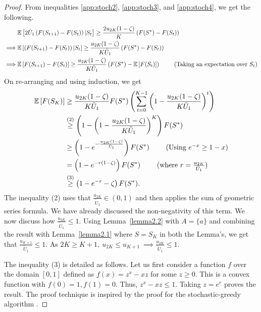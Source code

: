 \begin{proof}
From inequalities \ref{app:stoch2}, \ref{app:stoch3},  and \ref{app:stoch4}, we get the following.
\begin{align*}
& \mathbb{E}\left[2\tilde{U}_1\left(F(S_{t+1})- F(S_t)\right)|S_t\right] \geq \frac{2u_{2K}(1-\zeta)}{K} \left( F(S^*)-F(S_t)\right)\\
\implies & \mathbb{E}\left[\left(F(S_{t+1})- F(S_t)\right)|S_t\right] \geq \frac{u_{2K}(1-\zeta)}{K\tilde{U}_1} \left( F(S^*)-F(S_t)\right) \\
\implies & \mathbb{E}\left[F(S_{t+1})- F(S_t)\right] \geq \frac{u_{2K}(1-\zeta)}{K\tilde{U}_1} \left( F(S^*)-\mathbb{E}\left[F(S_t)\right]\right) \ \tag{Taking an expectation over $S_t$}
\end{align*}
On re-arranging and using induction, we get
\begin{align*}
\E\left[F(S_K)\right]&\geq \frac{u_{2K}(1-\zeta)}{K\tilde{U}_1} F(S^*)\left( \sum_{t=0}^{K-1} \left( 1-\frac{u_{2K}(1-\zeta)}{K\tilde{U}_1} \right)^t \right)\\
    &\stackrel{(2)}{\geq} \left(1-\left( 1-\frac{u_{2K}(1-\zeta)}{K\tilde{U}_1} \right)^K \right)F(S^*)  \\
    & \geq \left(1-e^{-\frac{u_{2K}(1-\zeta)}{\tilde{U}_1}} \right)F(S^*) \ \tag{Using $e^{-x}\geq 1-x$} \\
    & = \left(1-e^{-r(1-\zeta)} \right)F(S^*) \ \tag{where $r=\frac{u_{2K}}{\tilde{U}_1}$}
    \\
    & \stackrel{(3)}{\geq} \left(1-e^{-r}-\zeta\right)F(S^*).
\end{align*}
The inequality (2) uses that $\frac{u_{2K}}{\tilde{U}_1}\in (0, 1)$ and then applies the sum of geometric series formula. We have already discussed the non-negativity of this term. We now discuss how $\frac{u_{2K}}{\tilde{U}_1}\leq 1$.
Using Lemma~\ref{lemma2.2} with $A=\{a\}$ and combining the result with Lemma~\ref{lemma2.1} where $S=S_K$ in both the Lemma's, we get that $\frac{u_{K+1}}{\tilde{U}_1}\leq 1$. As $2K\geq K+1,\ u_{2K}\leq u_{K+1} \ \implies \frac{u_{2K}}{\tilde{U}_1}\leq 1$.

The inequality (3) is detailed as follows. Let us first consider a function $f$ over the domain $[0,  1]$ defined as $f(x) = z^x-xz$ for some $z\geq 0$. This is a convex function with $f(0)=1, f(1)=0$. Thus, $z^x-xz\leq 1$. Taking $z=e^r$ proves the result. The proof technique is inspired by the proof for the stochastic-greedy algorithm \citep{mirzasoleiman15a}.
\end{proof}

